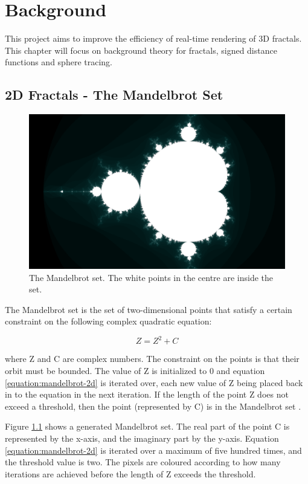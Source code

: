 \chapter{Background}
\label{chapter2}

This project aims to improve the efficiency of real-time rendering of 3D fractals. This chapter will focus on background theory for fractals, signed distance functions and sphere tracing.

\section{2D Fractals - The Mandelbrot Set}

\begin{figure}[ht]
	\centering
	\includegraphics[width=0.65\linewidth, frame]{Images/Mandelbrot-2D-Full.png}
	\caption{The Mandelbrot set. The white points in the centre are inside the set.}
	\label{figure:mandelbrot-2d-full}
\end{figure}

The Mandelbrot set is the set of two-dimensional points that satisfy a certain constraint on the following complex quadratic equation:

\begin{equation} \label{equation:mandelbrot-2d}
	Z = {Z^2} + C
\end{equation}

where Z and C are complex numbers. The constraint on the points is that their orbit must be bounded. The value of Z is initialized to 0 and equation \ref{equation:mandelbrot-2d} is iterated over, each new value of Z being placed back in to the equation in the next iteration. If the length of the point Z does not exceed a threshold, then the point (represented by C) is in the Mandelbrot set \cite{devaney1999mandelbrot}.\newline

Figure \ref{figure:mandelbrot-2d-full} shows a generated Mandelbrot set. The real part of the point C is represented by the x-axis, and the imaginary part by the y-axis. Equation \ref{equation:mandelbrot-2d} is iterated over a maximum of five hundred times, and the threshold value is two. The pixels are coloured according to how many iterations are achieved before the length of Z exceeds the threshold.

